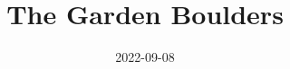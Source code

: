 \documentclass[10pt]{report}
\begin{document}
\title{The Garden Boulders}
\date{2022-09-08}
\maketitle

\newcommand\chapterColor{MidnightBlue}


\renewcommand\chapterColor{BrickRed}

\renewcommand\chapterColor{BurntOrange}

\renewcommand\chapterColor{PineGreen}

\renewcommand\chapterColor{RoyalPurple}

\renewcommand\chapterColor{Aquamarine}
\renewcommand\chapterColor{MidnightBlue}

\end{document}
